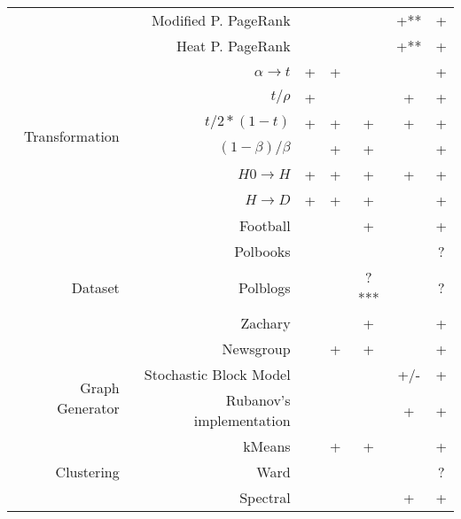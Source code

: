 \documentclass{article}
\begin{document}
\begin{table}[H]
\begin{tabular}{rr|cccc|c}
                & Modified P. PageRank     &            &          &        & +**         & \cellcolor{yellow!25} + \\
                & Heat P. PageRank         &            &          &        & +**         & \cellcolor{yellow!25} + \\
                \hline
\multirow{6}{*}{Transformation} & $\alpha \rightarrow t$ & + & +   &        &             & +      \\
                & $t / \rho$               & +          &          &        & +           & +      \\
                & $t / 2*(1 - t)$          & +          & +        & +      & +           & +      \\
                & $(1 - \beta) / \beta$    &            & +        & +      &             & +      \\
                & $H0 \rightarrow H$       & +          & +        & +      & +           & +      \\
                & $H \rightarrow D$        & +          & +        & +      &             & +      \\
                \hline
\multirow{5}{*}{Dataset} & Football        &            &          & +      &             & +      \\
                & Polbooks                 &            &          &        &             & \cellcolor{yellow!25} ? \\
                & Polblogs                 &            &          & ?***   &             & \cellcolor{yellow!25} ? \\
                & Zachary                  &            &          & +      &             & +      \\
                & Newsgroup                &            & +        & +      &             & +      \\
                \hline
\multirow{2}{*}{Graph Generator} & Stochastic Block Model &        &          &        & \cellcolor{yellow!25} +/- & \cellcolor{yellow!25} + \\
                & Rubanov's implementation &            &          &        & +           & +      \\
                \hline
\multirow{3}{*}{Clustering} & kMeans       &            & +        & +      &             & +      \\
                & Ward                     &            &          &        &             & \cellcolor{yellow!25} ? \\
                & Spectral                 &            &          &        & +           & +
\end{tabular}
\end{table}
\end{document}
